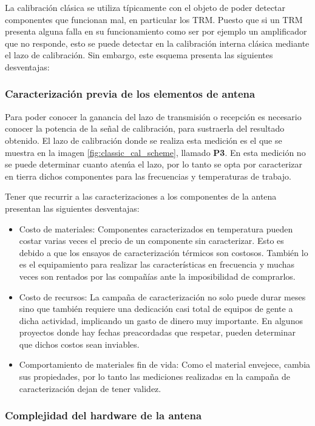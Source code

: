 La calibración clásica se utiliza típicamente con el objeto de poder detectar componentes que funcionan mal, en particular los
TRM. Puesto que si un TRM presenta alguna falla en su funcionamiento como ser por ejemplo un amplificador que no responde, esto
se puede detectar en la calibración interna clásica mediante el lazo de calibración. Sin embargo, este esquema presenta las
siguientes desventajas: 


\subsubsection{Caracterización previa de los elementos de antena}

Para poder conocer la ganancia del lazo de transmisión o recepción es necesario conocer la potencia de la señal de
calibración, para sustraerla del resultado obtenido. El lazo de calibración donde se realiza esta medición es el que se
muestra en la imagen \ref{fig:classic_cal_scheme}, llamado \textbf{P3}. En esta medición no se puede determinar cuanto atenúa
el lazo, por lo tanto se opta por caracterizar en tierra dichos componentes para las frecuencias y temperaturas de trabajo.

Tener que recurrir a las caracterizaciones a los componentes de la antena presentan las siguientes desventajas: 

\begin{itemize}
	\item Costo de materiales: Componentes caracterizados en temperatura pueden costar varias veces el precio de un componente sin
		caracterizar. Esto es debido a que los ensayos de caracterización térmicos son costosos. También lo es el equipamiento para
		realizar las características en frecuencia y muchas veces son rentados por las compañías ante la imposibilidad de comprarlos.
	\item Costo de recursos: La campaña de caracterización no solo puede durar meses sino que también requiere una dedicación
		casi total de equipos de gente a dicha actividad, implicando un gasto de dinero muy importante. En algunos proyectos donde hay
		fechas preacordadas que respetar, pueden determinar que dichos costos sean inviables.
	\item Comportamiento de materiales fin de vida: Como el material envejece, cambia sus propiedades, por lo tanto las mediciones
		realizadas en la campaña de caracterización dejan de tener validez.
\end{itemize}


\subsubsection{Complejidad del hardware de la antena}

